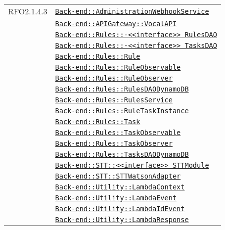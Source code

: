 \begin{longtable}{|>{\centering}m{3cm}|m{10cm}<{\centering}|}
RFO2.1.4.3 & \hyperref[Back-end::AdministrationWebhookService]{\texttt{Back-end::AdministrationWebhookService}}\\
& \hyperref[Back-end::APIGateway::VocalAPI]{\texttt{Back-end::APIGateway::VocalAPI}}\\
& \hyperref[Back-end::Rules::<<interface>> RulesDAO]{\texttt{Back-end::Rules::-\linebreak <<interface>> RulesDAO}}\\
& \hyperref[Back-end::Rules::<<interface>> TasksDAO]{\texttt{Back-end::Rules::-\linebreak <<interface>> TasksDAO}}\\
& \hyperref[Back-end::Rules::Rule]{\texttt{Back-end::Rules::Rule}}\\
& \hyperref[Back-end::Rules::RuleObservable]{\texttt{Back-end::Rules::RuleObservable}}\\
& \hyperref[Back-end::Rules::RuleObserver]{\texttt{Back-end::Rules::RuleObserver}}\\
& \hyperref[Back-end::Rules::RulesDAODynamoDB]{\texttt{Back-end::Rules::RulesDAODynamoDB}}\\
& \hyperref[Back-end::Rules::RulesService]{\texttt{Back-end::Rules::RulesService}}\\
& \hyperref[Back-end::Rules::RuleTaskInstance]{\texttt{Back-end::Rules::RuleTaskInstance}}\\
& \hyperref[Back-end::Rules::Task]{\texttt{Back-end::Rules::Task}}\\
& \hyperref[Back-end::Rules::TaskObservable]{\texttt{Back-end::Rules::TaskObservable}}\\
& \hyperref[Back-end::Rules::TaskObserver]{\texttt{Back-end::Rules::TaskObserver}}\\
& \hyperref[Back-end::Rules::TasksDAODynamoDB]{\texttt{Back-end::Rules::TasksDAODynamoDB}}\\
& \hyperref[Back-end::STT::<<interface>> STTModule]{\texttt{Back-end::STT::<<interface>> STTModule}}\\
& \hyperref[Back-end::STT::STTWatsonAdapter]{\texttt{Back-end::STT::STTWatsonAdapter}}\\
& \hyperref[Back-end::Utility::LambdaContext]{\texttt{Back-end::Utility::LambdaContext}}\\
& \hyperref[Back-end::Utility::LambdaEvent]{\texttt{Back-end::Utility::LambdaEvent}}\\
& \hyperref[Back-end::Utility::LambdaIdEvent]{\texttt{Back-end::Utility::LambdaIdEvent}}\\
& \hyperref[Back-end::Utility::LambdaResponse]{\texttt{Back-end::Utility::LambdaResponse}}\\

\end{longtable}

